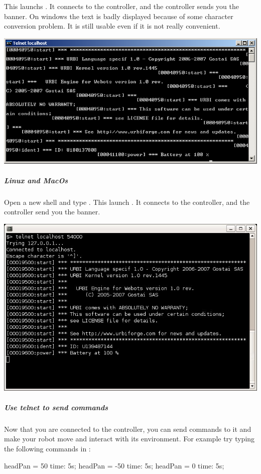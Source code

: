 This launchs . It connects to the \urbi controller,
and the \urbi controller sends you the \urbi banner. On windows the
text is badly displayed because of some character conversion
problem. It is still usable even if it is not really convenient.

\begin{center}
  \includegraphics[width=.8\linewidth]{img/webots/telnet-urbi-windows}
\end{center}

\subparagraph{Linux and MacOs}

Open a new shell and type .  This
launch . It connects to the \urbi controller, and the
\urbi controller send you the \urbi banner.

\begin{center}
  \includegraphics[width=.8\linewidth]{img/webots/telnet-urbi-linux}
\end{center}

\subparagraph{Use telnet to send commands}

Now that you are connected to the \urbi controller, you can send
commands to it and make your robot move and interact with its
environment. For example try typing the following commands in
:

\begin{urbifixme}
headPan = 50 time: 5s;
headPan = -50 time: 5s;
headPan = 0 time: 5s;
\end{urbifixme}

